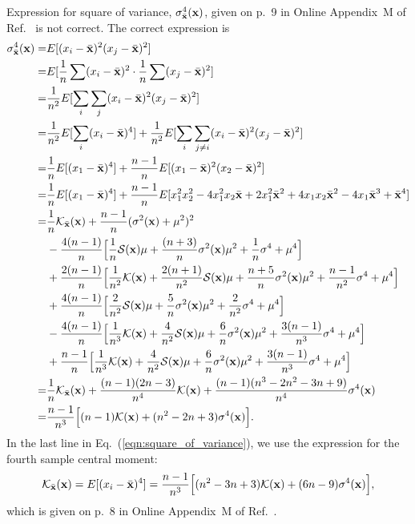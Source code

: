 \documentclass[a4paper]{article}
\newcommand{\ex}[1]{E[ #1 ]}
\newcommand{\xb}{\bar{\bf x}}
\newcommand{\sgm}{\sigma^2({\bf x})}
\newcommand{\ess}{{\cal S}({\bf x})}
\begin{document}
Expression for square of variance, $\sigma_{\xb}^4({\bf x})$, given on p.~9 in Online Appendix~M of Ref.~\cite{Klements2009} is not correct.  The correct expression is
\begin{align}
  \begin{split}
    \sigma_{\xb}^4({\bf x}) =& \ex{(x_i-\xb)^2(x_j-\xb)^2} \\
    =& \ex{\frac{1}{n}\sum(x_i-\xb)^2\cdot\frac{1}{n}\sum(x_j-\xb)^2} \\
    =& \frac{1}{n^2} \ex{\sum_i \sum_j (x_i-\xb)^2(x_j-\xb)^2} \\
    =& \frac{1}{n^2} \ex{\sum_i (x_i-\xb)^4} + \frac{1}{n^2} \ex{\sum_i \sum_{j\ne i} (x_i-\xb)^2(x_j-\xb)^2} \\
    =& \frac{1}{n} \ex{(x_1-\xb)^4} + \frac{n-1}{n} \ex{(x_1-\xb)^2(x_2-\xb)^2} \\
    =& \frac{1}{n} \ex{(x_1-\xb)^4} + \frac{n-1}{n} \ex{x_1^2 x_2^2 - 4 x_1^2 x_2 \xb + 2x_1^2 \xb^2 + 4 x_1 x_2 \xb^2 - 4 x_1 \xb^3 + \xb^4} \\
    =& \frac{1}{n} {\cal K_{\xb}(\bf x)}
    + \frac{n-1}{n} (\sgm + \mu^2)^2 \\
    &- \frac{4(n-1)}{n} \Big[ \frac{1}{n} \ess \mu + \frac{(n+3)}{n} \sgm \mu^2 + \frac{1}{n} \sigma^4 + \mu^4 \Big] \\
    &+ \frac{2(n-1)}{n} \Big[ \frac{1}{n^2} {\cal K}({\bf x}) + \frac{2(n+1)}{n^2} \ess \mu + \frac{n+5}{n} \sgm \mu^2 + \frac{n-1}{n^2} \sigma^4 + \mu^4 \Big] \\
    &+ \frac{4(n-1)}{n} \Big[ \frac{2}{n^2} \ess \mu + \frac{5}{n} \sgm \mu^2 + \frac{2}{n^2} \sigma^4 + \mu^4\Big] \\
    &- \frac{4(n-1)}{n} \Big[ \frac{1}{n^3} {\cal K}({\bf x}) + \frac{4}{n^2} \ess \mu + \frac{6}{n} \sgm \mu^2 + \frac{3(n-1)}{n^3} \sigma^4 + \mu^4 \Big] \\
    &+ \frac{n-1}{n} \Big[ \frac{1}{n^3} {\cal K}({\bf x}) + \frac{4}{n^2} \ess \mu + \frac{6}{n} \sgm \mu^2 + \frac{3(n-1)}{n^3} \sigma^4 + \mu^4 \Big] \\
    =& \frac{1}{n} {\cal K_{\xb}(\bf x)} + \frac{(n-1)(2n-3)}{n^4} {\cal K}({\bf x})
    + \frac{(n-1)(n^3-2n^2-3n+9)}{n^4} \sigma^4({\bf x}) \\
    =& \frac{n-1}{n^3} \Big[ (n-1) {\cal K}({\bf x}) + (n^2-2n+3) \sigma^4({\bf x}) \Big].
  \end{split}
  \label{eqn:square_of_variance}
\end{align}
In the last line in Eq.~(\ref{eqn:square_of_variance}), we use the expression for the fourth sample central moment:
\begin{align}
  \begin{split}
    {\cal K_{\xb}(\bf x)} = \ex{(x_i-\xb)^4} = \frac{n-1}{n^3} \Big[ (n^2-3n+3) {\cal K}({\bf x}) + (6n-9)\sigma^4({\bf x}) \Big],
  \end{split}
  \label{eqn:fourth_sample_central_moment}
\end{align}
which is given on p.~8 in Online Appendix~M of Ref.~\cite{Klements2009}.
\end{document}
